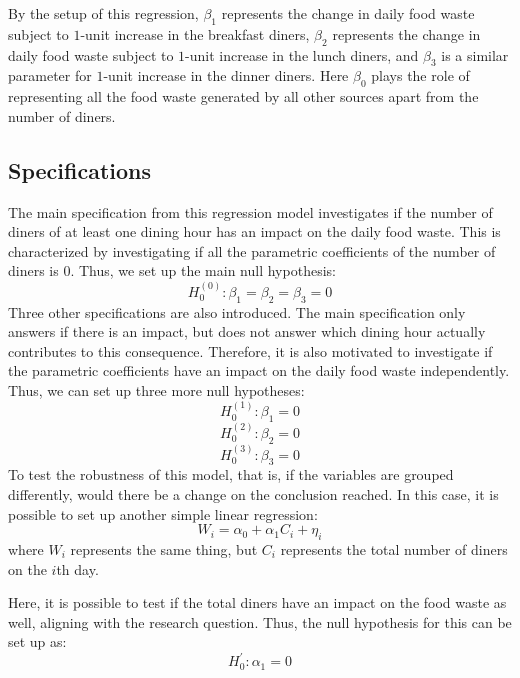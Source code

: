By the setup of this regression, $\beta_1$ represents the change in daily food waste subject to $1$-unit increase in the breakfast diners, $\beta_2$ represents the change in daily food waste subject to $1$-unit increase in the lunch diners, and $\beta_3$ is a similar parameter for $1$-unit increase in the dinner diners. Here $\beta_0$ plays the role of representing all the food waste generated by all other sources apart from the number of diners.

\subsection{Specifications}
The main specification from this regression model investigates if the number of diners of at least one dining hour has an impact on the daily food waste. This is characterized by investigating if all the parametric coefficients of the number of diners is $0$. Thus, we set up the main null hypothesis:
$$H_0^{(0)}: \beta_1 = \beta_2 = \beta_3 = 0$$
Three other specifications are also introduced. The main specification only answers if there is an impact, but does not answer which dining hour actually contributes to this consequence. Therefore, it is also motivated to investigate if the parametric coefficients have an impact on the daily food waste independently. Thus, we can set up three more null hypotheses:
$$H_0^{(1)}: \beta_1 = 0$$
$$H_0^{(2)}: \beta_2 = 0$$
$$H_0^{(3)}: \beta_3 = 0$$
To test the robustness of this model, that is, if the variables are grouped differently, would there be a change on the conclusion reached. In this case, it is possible to set up another simple linear regression:
$$W_i = \alpha_0 + \alpha_1 C_i + \eta_i$$
where $W_i$ represents the same thing, but $C_i$ represents the total number of diners on the $i$th day.

Here, it is possible to test if the total diners have an impact on the food waste as well, aligning with the research question. Thus, the null hypothesis for this can be set up as:
$$H_0^{'}: \alpha_1 = 0$$

\newpage